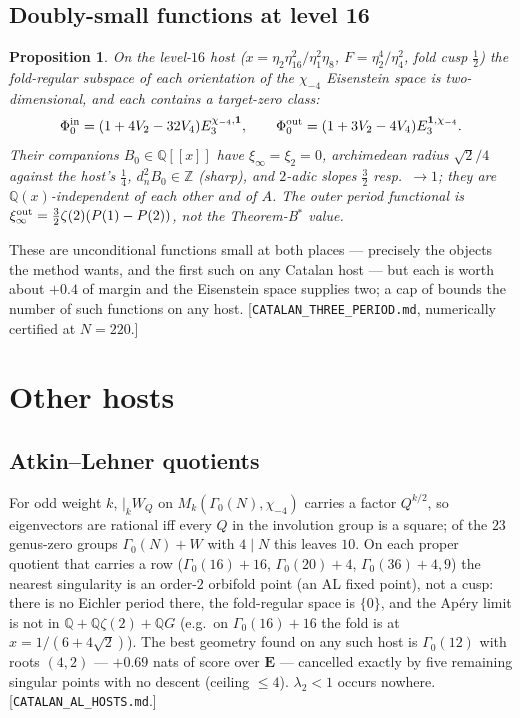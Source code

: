 \documentclass[11pt]{amsart}
\newtheorem{proposition}[theorem]{Proposition}
\theoremstyle{remark}
\newcommand{\Z}{\mathbb Z}\newcommand{\Q}{\mathbb Q}\newcommand{\R}{\mathbb R}\newcommand{\C}{\mathbb C}
\begin{document}
\subsection{Doubly-small functions at level 16}
\begin{proposition}\label{ds}
On the level-$16$ host ($x=\eta_2\eta_{16}^2/\eta_1^2\eta_8$, $F=\eta_2^4/\eta_4^2$, fold cusp $\tfrac12$) the fold-regular subspace of each orientation of the $\chi_{-4}$ Eisenstein space is two-dimensional, and each contains a target-zero class:
\[\Phi_0^{\rm in}=(1+4V_2-32V_4)E_3^{\chi_{-4},\mathbf1},\qquad \Phi_0^{\rm out}=(1+3V_2-4V_4)E_3^{\mathbf1,\chi_{-4}} .\]
Their companions $B_0\in\Q[[x]]$ have $\xi_\infty=\xi_2=0$, archimedean radius $\sqrt2/4$ against the host's $\tfrac14$, $d_n^2B_0\in\Z$ (sharp), and $2$-adic slopes $\tfrac32$ resp.\ $\to1$; they are $\Q(x)$-independent of each other and of $A$. The outer period functional is $\xi^{\rm out}_\infty=\tfrac32\zeta(2)(P(1)-P(2))$, not the Theorem-B$^*$ value.
\end{proposition}
These are unconditional functions small at both places --- precisely the objects the method wants, and the first such on any Catalan host --- but each is worth about $+0.4$ of margin and the Eisenstein space supplies two; a cap of \cite[\S4.3]{AH} bounds the number of such functions on any host. [\texttt{CATALAN\_THREE\_PERIOD.md}, numerically certified at $N=220$.]

\section{Other hosts}
\subsection{Atkin--Lehner quotients} For odd weight $k$, $|_kW_Q$ on $M_k(\Gamma_0(N),\chi_{-4})$ carries a factor $Q^{k/2}$, so eigenvectors are rational iff every $Q$ in the involution group is a square; of the $23$ genus-zero groups $\Gamma_0(N)+W$ with $4\mid N$ this leaves $10$. On each proper quotient that carries a row ($\Gamma_0(16)+16$, $\Gamma_0(20)+4$, $\Gamma_0(36)+4,9$) the nearest singularity is an order-$2$ orbifold point (an AL fixed point), not a cusp: there is no Eichler period there, the fold-regular space is $\{0\}$, and the Ap\'ery limit is not in $\Q+\Q\zeta(2)+\Q G$ (e.g.\ on $\Gamma_0(16)+16$ the fold is at $x=1/(6+4\sqrt2)$). The best geometry found on any such host is $\Gamma_0(12)$ with roots $(4,2)$ --- $+0.69$ nats of score over $\mathbf E$ --- cancelled exactly by five remaining singular points with no descent (ceiling $\le4$). $\lambda_2<1$ occurs nowhere. [\texttt{CATALAN\_AL\_HOSTS.md}.]
\end{document}

